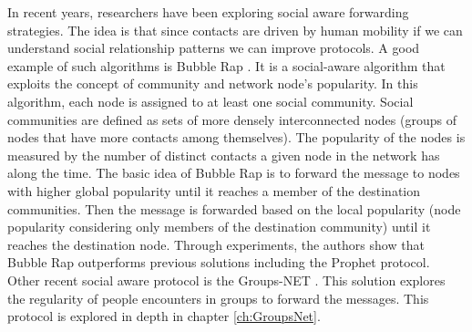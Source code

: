 In recent years, researchers have been exploring social aware forwarding strategies. The idea is that since contacts are driven by human mobility if we can understand social relationship patterns we can improve protocols. A good example of such algorithms is Bubble Rap \citep{hui2011bubble}. It is a social-aware algorithm that exploits the concept of community and network node’s popularity. In this algorithm, each node is assigned to at least one social community. Social communities are defined as sets of more densely interconnected nodes (groups of nodes that have more contacts among themselves). The popularity of the nodes is measured by the number of distinct contacts a given node in the network has along the time. The basic idea of Bubble Rap is to forward the message to nodes with higher global popularity until it reaches a member of the destination communities. Then the message is forwarded based on the local popularity (node popularity considering only members of the destination community) until it reaches the destination node. Through experiments, the authors show that Bubble Rap outperforms previous solutions including the Prophet protocol. Other recent social aware protocol is the Groups-NET \citep{nunes2016groups}. This solution explores the regularity of people encounters in groups to forward the messages. This protocol is explored in depth in chapter \ref{ch:GroupsNet}.